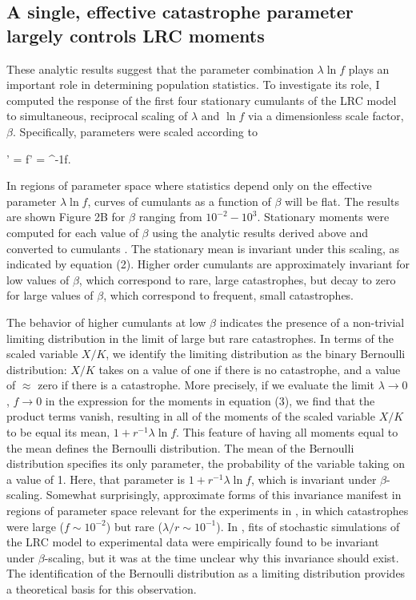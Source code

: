 \subsection{A single, effective catastrophe parameter largely controls LRC moments}

These analytic results suggest that the parameter combination $\lambda\ln f$ plays an important role in determining population statistics.  To investigate its role, I computed the response of the first four stationary cumulants of the LRC model to simultaneous, reciprocal scaling of $\lambda$ and $\ln f$ via a dimensionless scale factor, $\beta$.  Specifically, parameters were scaled according to

\be
\lambda' = \beta\lambda \text{,\hspace{1cm}} \ln f' = \beta^{-1}\ln f.
\ee

In regions of parameter space where statistics depend only on the effective parameter $\lambda\ln f$, curves of cumulants as a function of $\beta$ will be flat.  The results are shown Figure 2B for $\beta$ ranging from $10^{-2}-10^3$.  Stationary moments were computed for each value of $\beta$ using the analytic results derived above and converted to cumulants \cite{broca2004cumulant}.  The stationary mean is invariant under this scaling, as indicated by equation (2).  Higher order cumulants are approximately invariant for low values of $\beta$, which correspond to rare, large catastrophes, but decay to zero for large values of $\beta$, which correspond to frequent, small catastrophes.  

The behavior of higher cumulants at low $\beta$ indicates the presence of a non-trivial limiting distribution in the limit of large but rare catastrophes. In terms of the scaled variable $X/K$, we identify the limiting distribution as the binary Bernoulli distribution: $X/K$ takes on a value of one if there is no catastrophe, and a value of $\approx$ zero if there is a catastrophe. More precisely, if we evaluate the limit $\lambda \to 0$, $f \to 0$ in the expression for the moments in equation (3), we find that the product terms vanish, resulting in all of the moments of the scaled variable $X/K$ to be equal its mean, $1+r^{-1}\lambda\ln f$. This feature of having all moments equal to the mean defines the Bernoulli distribution. The mean of the Bernoulli distribution specifies its only parameter, the probability of the variable taking on a value of 1. Here, that parameter is $1+r^{-1}\lambda\ln f$, which is invariant under $\beta$-scaling. Somewhat surprisingly, approximate forms of this invariance manifest in regions of parameter space relevant for the experiments in \cite{wiles_host_2016}, in which catastrophes were large ($f\sim 10^{-2}$) but rare ($\lambda/r \sim 10^{-1}$). In \cite{wiles_host_2016}, fits of stochastic simulations of the LRC model to experimental data were empirically found to be invariant under $\beta$-scaling, but it was at the time unclear why this invariance should exist. The identification of the Bernoulli distribution as a limiting distribution provides a theoretical basis for this observation. 

